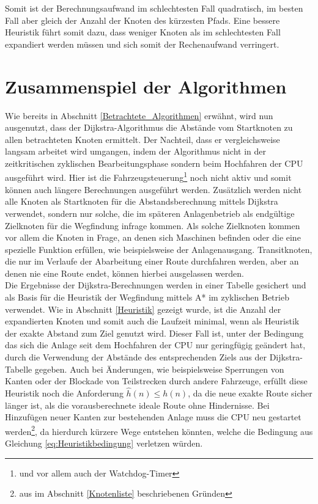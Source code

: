		Somit ist der Berechnungsaufwand im schlechtesten Fall quadratisch, im besten Fall aber gleich der Anzahl der Knoten des kürzesten Pfads. Eine bessere Heuristik führt somit dazu, dass weniger Knoten als im schlechtesten Fall expandiert werden müssen und sich somit der Rechenaufwand verringert.
		
	\section{Zusammenspiel der Algorithmen}
		\label{Verwendung_Alg}
		Wie bereits in Abschnitt \ref{Betrachtete_Algorithmen} erwähnt, wird nun ausgenutzt, dass der Dijkstra-Algorithmus die Abstände vom Startknoten zu allen betrachteten Knoten ermittelt.  Der Nachteil, dass er vergleichsweise langsam arbeitet wird umgangen, indem der Algorithmus nicht in der zeitkritischen zyklischen Bearbeitungsphase sondern beim Hochfahren der CPU ausgeführt wird. Hier ist die Fahrzeugsteuerung\footnote{und vor allem auch der Watchdog-Timer} noch nicht aktiv und somit können auch längere Berechnungen ausgeführt werden. Zusätzlich werden nicht alle Knoten als Startknoten für die Abstandsberechnung mittels Dijkstra verwendet, sondern nur solche, die im späteren Anlagenbetrieb als endgültige Zielknoten für die Wegfindung infrage kommen. Als solche Zielknoten kommen vor allem die Knoten in Frage, an denen sich Maschinen befinden oder die eine spezielle Funktion erfüllen, wie beispielsweise der Anlagenausgang. Transitknoten, die nur im Verlaufe der Abarbeitung einer Route durchfahren werden, aber an denen nie eine Route endet, können hierbei ausgelassen werden.
		\\[4pt]
		Die Ergebnisse der Dijkstra-Berechnungen werden in einer Tabelle gesichert und als Basis für die Heuristik der Wegfindung mittels A* im zyklischen Betrieb verwendet. Wie in  Abschnitt \ref{Heuristik} gezeigt wurde, ist die Anzahl der expandierten Knoten und somit auch die Laufzeit minimal, wenn als Heuristik der exakte Abstand zum Ziel genutzt wird. Dieser Fall ist, unter der Bedingung das sich die Anlage seit dem Hochfahren der CPU nur geringfügig geändert hat, durch die Verwendung der Abstände des entsprechenden Ziels aus der Dijkstra-Tabelle gegeben. Auch bei Änderungen, wie beispielsweise Sperrungen von Kanten oder der Blockade von Teilstrecken durch andere Fahrzeuge, erfüllt diese Heuristik noch die Anforderung $\hat{h}(n)\le h(n)$, da die neue exakte Route sicher länger ist, als die vorausberechnete ideale Route ohne Hindernisse. Bei Hinzufügen neuer Kanten zur bestehenden Anlage muss die CPU neu gestartet werden\footnote{aus im Abschnitt \ref{Knotenliste} beschriebenen Gründen}, da hierdurch kürzere Wege entstehen könnten, welche die Bedingung aus Gleichung \ref{eq:Heuristikbedingung} verletzen würden.
		
		
				





